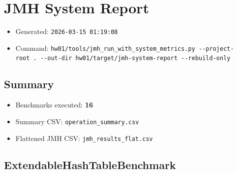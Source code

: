 \documentclass[
  10pt,
]{article}
\author{}
\date{}
\providecommand{\tightlist}{%
  \setlength{\itemsep}{0pt}\setlength{\parskip}{0pt}}
\begin{document}
\section{JMH System Report}\label{jmh-system-report}

\begin{itemize}
\tightlist
\item
  Generated: \texttt{2026-03-15\ 01:19:08}
\item
  Command:
  \texttt{hw01/tools/jmh\_run\_with\_system\_metrics.py\ -\/-project-root\ .\ -\/-out-dir\ hw01/target/jmh-system-report\ -\/-rebuild-only}
\end{itemize}

\subsection{Summary}\label{summary}

\begin{itemize}
\tightlist
\item
  Benchmarks executed: \textbf{16}
\item
  Summary CSV: \texttt{operation\_summary.csv}
\item
  Flattened JMH CSV: \texttt{jmh\_results\_flat.csv}
\end{itemize}

\subsection{ExtendableHashTableBenchmark}\label{extendablehashtablebenchmark}
\end{document}
